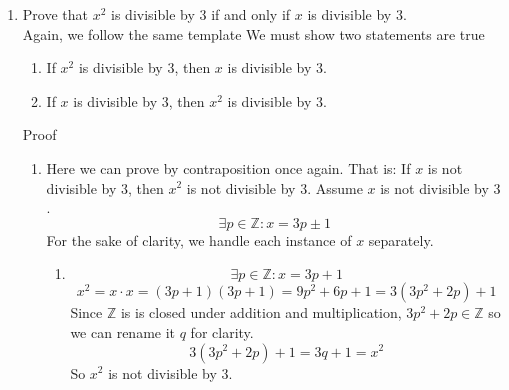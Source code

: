 \documentclass[12pt]{article}
\begin{document}
\begin{enumerate}
\begin{enumerate}
        \item Prove that $x^2$ is divisible by $3$ if and only if
              $x$ is divisible by $3$. \\

            Again, we follow the same template
            We must show two statements are true
            \begin{enumerate}
                \item If $x^2$ is divisible by $3$, then $x$ is divisible by $3$.
                \item If $x$ is divisible by $3$, then $x^2$ is divisible by $3$.
            \end{enumerate}

            Proof

            \begin{enumerate}
                \item
                    Here we can prove by contraposition once again.
                    That is:
                    If $x$ is not divisible by $3$,
                    then $x^2$ is not divisible by $3$.
                    Assume $x$ is not divisible by $3$.
                    \[\exists p \in \mathbb{Z} : x = 3p \pm 1\]
                    For the sake of clarity,
                    we handle each instance of $x$ separately.
                    \begin{enumerate}
                        \item
                            \[\exists p \in \mathbb{Z} : x = 3p + 1\]
                            \[
                                x^2 = x \cdot x = (3p + 1)(3p + 1) =
                                9p^2 + 6p + 1 = 3(3p^2 + 2p) + 1
                            \]
                            Since $\mathbb{Z}$ is is closed under
                            addition and multiplication,
                            $3p^2 + 2p \in \mathbb{Z}$ so we can rename it $q$
                            for clarity.
                            \[3(3p^2 + 2p) + 1 = 3q + 1 = x^2\]
                            So $x^2$ is not divisible by $3$.


\end{enumerate}
\end{enumerate}
\end{enumerate}
\end{enumerate}
\end{document}
